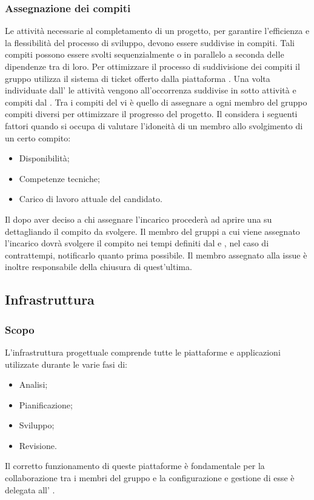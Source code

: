 \subsubsection{Assegnazione dei compiti}
Le attività necessarie al completamento di un progetto, per garantire l'efficienza e la flessibilità del processo di sviluppo, devono essere suddivise in compiti. Tali compiti possono essere svolti sequenzialmente o in parallelo a seconda delle dipendenze tra di loro. Per ottimizzare il processo di suddivisione dei compiti il gruppo utilizza il sistema di ticket offerto dalla piattaforma .
Una volta individuate dall'\ana{} le attività vengono all'occorrenza suddivise in sotto attività e compiti dal \RdP{}. Tra i compiti del \RdP{} vi è quello di assegnare a ogni membro del gruppo compiti diversi per ottimizzare il progresso del progetto. Il \RdP{} considera i seguenti fattori quando si occupa di valutare l'idoneità di un membro allo svolgimento di un certo compito:
\begin{itemize}
\item Disponibilità;
\item Competenze tecniche;
\item Carico di lavoro attuale del candidato.
\end{itemize}
Il \RdP{} dopo aver deciso a chi assegnare l'incarico procederà ad aprire una  su  dettagliando il compito da svolgere.
Il membro del gruppi a cui viene assegnato l'incarico dovrà svolgere il compito nei tempi definiti dal \RdP{} e , nel caso di contrattempi, notificarlo quanto prima possibile. Il membro assegnato alla issue è inoltre responsabile della chiusura di quest'ultima.

\subsection{Infrastruttura}
\subsubsection{Scopo}
L'infrastruttura progettuale comprende tutte le piattaforme e applicazioni utilizzate durante le varie fasi di:
\begin{itemize}
\item Analisi;
\item Pianificazione;
\item Sviluppo;
\item Revisione.
\end{itemize}
Il corretto funzionamento di queste piattaforme è fondamentale per la collaborazione tra i membri del gruppo e la configurazione e gestione di esse è delegata all' \adm{}.

